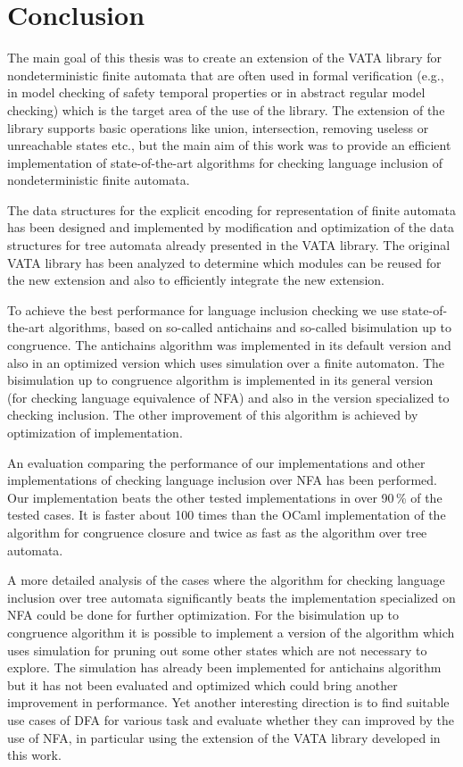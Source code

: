 \chapter{Conclusion}
\label{concl}
The main goal of this thesis was to create an extension of the VATA library for nondeterministic finite automata 
that are often used in formal verification (e.g., in model checking of safety temporal properties or in 
abstract regular model checking) which is the target area of the use of the library. The extension of the library supports
basic operations like union, intersection, removing useless or unreachable states etc., but the main aim of this work was to provide
an efficient implementation of state-of-the-art algorithms for checking language inclusion of nondeterministic finite automata.

The data structures for the explicit encoding for representation of finite automata has been designed
and implemented by modification and optimization of the data structures for tree automata already presented in the VATA library. 
The original VATA library has been analyzed to determine
which modules can be reused for the new extension and also to efficiently integrate the new extension.

To achieve the best performance for language inclusion checking we use state-of-the-art algorithms, based on so-called antichains and so-called bisimulation
up to congruence. The antichains algorithm was implemented in its default version and also in an optimized version which uses simulation over a finite automaton. 
The bisimulation up to congruence algorithm is implemented in its general version (for checking language equivalence of NFA) and also in
the version specialized to checking inclusion. %
The other improvement of this algorithm is achieved by optimization of implementation.

An evaluation comparing the performance of our implementations and other implementations of checking language inclusion over NFA has been performed.
Our implementation beats the other tested implementations in over 90\,\% of the tested cases. It is faster about 100 times than the OCaml implementation of the
algorithm for congruence closure and twice as fast as the algorithm over tree automata.

A more detailed analysis of the cases where the algorithm for checking language inclusion over tree automata significantly 
beats the implementation specialized on NFA could be done for further optimization. 
For the bisimulation up to congruence algorithm it is possible to implement a version of the algorithm 
which uses simulation for pruning out some other states which are not necessary to explore. The simulation has already been implemented for antichains 
algorithm but it has not been evaluated and optimized which could bring another improvement in performance. 
Yet another interesting direction is to find suitable use cases of DFA for various task and evaluate whether they can improved by the use of NFA, in
particular using the extension of the VATA library developed in this work.
